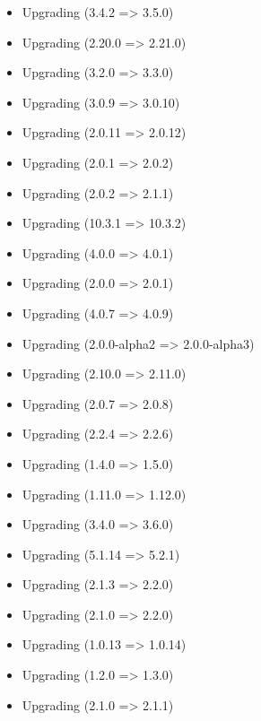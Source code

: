     \begin{itemize}
        \item Upgrading  (3.4.2 => 3.5.0)
        \item Upgrading  (2.20.0 => 2.21.0)
        \item Upgrading  (3.2.0 => 3.3.0)
        \item Upgrading  (3.0.9 => 3.0.10)
        \item Upgrading  (2.0.11 => 2.0.12)
        \item Upgrading  (2.0.1 => 2.0.2)
        \item Upgrading  (2.0.2 => 2.1.1)
        \item Upgrading  (10.3.1 => 10.3.2)
        \item Upgrading  (4.0.0 => 4.0.1)
        \item Upgrading  (2.0.0 => 2.0.1)
        \item Upgrading  (4.0.7 => 4.0.9)
        \item Upgrading  (2.0.0-alpha2 => 2.0.0-alpha3)
        \item Upgrading  (2.10.0 => 2.11.0)
        \item Upgrading  (2.0.7 => 2.0.8)
        \item Upgrading  (2.2.4 => 2.2.6)
        \item Upgrading  (1.4.0 => 1.5.0)
        \item Upgrading  (1.11.0 => 1.12.0)
        \item Upgrading  (3.4.0 => 3.6.0)
        \item Upgrading  (5.1.14 => 5.2.1)
        \item Upgrading  (2.1.3 => 2.2.0)
        \item Upgrading  (2.1.0 => 2.2.0)
        \item Upgrading  (1.0.13 => 1.0.14)
        \item Upgrading  (1.2.0 => 1.3.0)
        \item Upgrading  (2.1.0 => 2.1.1)

\end{itemize}
